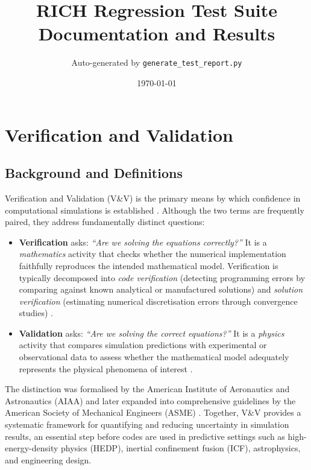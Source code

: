 \documentclass[11pt,a4paper]{article}
\title{\textbf{RICH Regression Test Suite} \\ \large Documentation and Results}
\author{Auto-generated by \texttt{generate\_test\_report.py}}
\date{\today}
\begin{document}
\maketitle
\tableofcontents
\newpage


\section{Verification and Validation}

\subsection{Background and Definitions}

Verification and Validation (V\&V) is the primary means by which confidence in
computational simulations is established \cite{roache1998,oberkampf2010}.
Although the two terms are frequently paired, they address fundamentally
distinct questions:

\begin{itemize}
  \item \textbf{Verification} asks: \emph{``Are we solving the equations
    correctly?''}  It is a \emph{mathematics} activity that checks whether the
    numerical implementation faithfully reproduces the intended mathematical
    model.  Verification is typically decomposed into \emph{code verification}
    (detecting programming errors by comparing against known analytical or
    manufactured solutions) and \emph{solution verification} (estimating
    numerical discretisation errors through convergence studies)
    \cite{roache1998,salari2000}.
  \item \textbf{Validation} asks: \emph{``Are we solving the correct
    equations?''}  It is a \emph{physics} activity that compares simulation
    predictions with experimental or observational data to assess whether the
    mathematical model adequately represents the physical phenomena of interest
    \cite{oberkampf2010}.
\end{itemize}

The distinction was formalised by the American Institute of Aeronautics and
Astronautics (AIAA) \cite{aiaa1998} and later expanded into comprehensive
guidelines by the American Society of Mechanical Engineers (ASME)
\cite{asme2006}.  Together, V\&V provides a systematic framework for
quantifying and reducing uncertainty in simulation results, an essential step
before codes are used in predictive settings such as high-energy-density physics
(HEDP), inertial confinement fusion (ICF), astrophysics, and engineering
design.
\end{document}
